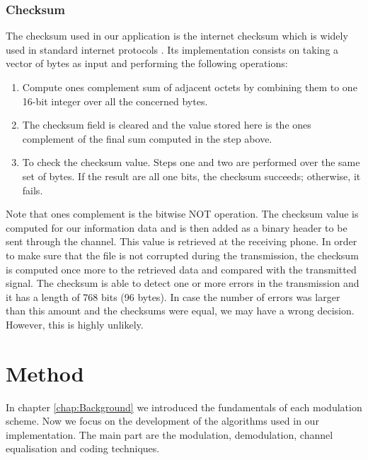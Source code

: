 \documentclass[12pt,a4paper,openright]{report}
\begin{document}
\subsection{Checksum}
\label{subsec:Checksum}

The checksum used in our application is the internet checksum which is widely used in standard internet protocols \cite{Checksumref1}. Its implementation consists on taking a vector of bytes as input and performing the following operations:
 
\begin{enumerate}
  \item Compute ones complement sum of adjacent octets by combining them to one 16-bit integer over all the concerned bytes.
  \item The checksum field is cleared and the value stored here is the ones complement of the final sum computed in the step above.
  \item To check the checksum value. Steps one and two are performed over the same set of bytes. If the result are all one bits, the checksum succeeds; otherwise, it fails.
\end{enumerate}
 
Note that ones complement is the bitwise NOT operation. The checksum value is computed for our information data and is then added as a binary header to be sent through the channel. This value is retrieved at the receiving phone. In order to make sure that the file is not corrupted during the transmission, the checksum is computed once more to the retrieved data and compared with the transmitted signal. The checksum is able to detect one or more errors in the transmission and it has a length of 768 bits (96 bytes). In case the number of errors was larger than this amount and the checksums were equal, we may have a wrong decision. However, this is highly unlikely.
 


\chapter{Method}
\label{chap:method}
In chapter \ref{chap:Background} we introduced the fundamentals of each modulation scheme. Now we focus on the development of the algorithms used in our implementation. The main part are the modulation, demodulation, channel equalisation and coding techniques. 
\end{document}
